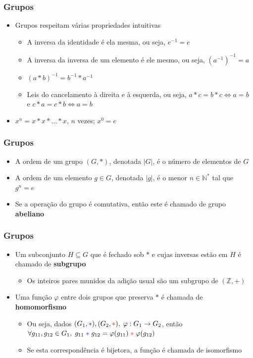\documentclass[12pt]{beamer}
\begin{document}
\begin{frame}
  \frametitle{Grupos}
  \begin{itemize}
    \item<1-> Grupos respeitam várias propriedades intuitivas
    \begin{itemize}[itemsep=0pt]
      \item<2-> A inversa da identidade é ela mesma, ou seja, $e^{-1} = e$
      \item<3-> A inversa da inversa de um elemento é ele mesmo, ou seja,
          ${(a^{-1})}^{-1} = a$
      \item<4-> ${(a * b)}^{-1} = b^{-1} * a^{-1}$
      \item<5-> Leis do cancelamento à direita e à esquerda, ou seja,
          $a * c = b * c \Leftrightarrow a = b$ e
            $c * a = c * b \Leftrightarrow a = b$
    \end{itemize}
    \item<6-> $x^{n} = x * x * \dots * x$, $n$ vezes; $x^{0} = e$
  \end{itemize}
\end{frame}

\begin{frame}
  \frametitle{Grupos}
  \begin{itemize}
    \item A ordem de um grupo $(G, *)$, denotada $|G|$, é o número de elementos
        de $G$
    \item A ordem de um elemento $g \in G$, denotada $|g|$, é o menor $n \in
        \mathbb{N}^{*}$ tal que $g^{n} = e$
    \item<2-> Se a operação do grupo é comutativa, então este é chamado de
        grupo \textbf{abeliano}
  \end{itemize}
\end{frame}

\begin{frame}
  \frametitle{Grupos}
  \begin{itemize}
    \item<1-> Um subconjunto $H \subseteq G$ que é fechado sob $*$ e
        cujas inversas estão em $H$ é chamado de \textbf{subgrupo}
    \begin{itemize}
      \item Os inteiros pares munidos da adição usual são um subgrupo de
          $(\mathbb{Z}, +)$
    \end{itemize}
    \item<2-> Uma função $\varphi$ entre dois grupos que preserva $*$ é chamada
        de \textbf{homomorfismo}
    \begin{itemize}[itemsep=0pt]
      \item Ou seja, dados $(G_{1}, {\color{blue}*}), (G_{2},
          {\color{red}*}),\; \varphi : G_{1} \rightarrow G_{2}$, então $\forall
            g_{11}, g_{12} \in G_{1},\; g_{11}\; {\color{blue}*}\; g_{12} =
            \varphi(g_{11})\; {\color{red}*}\; \varphi(g_{12})$
      \item<3-> Se esta correspondência é bijetora, a função é chamada de
          isomorfismo
    \end{itemize}
  \end{itemize}
\end{frame}
\end{document}
